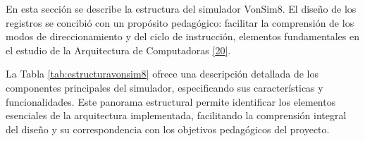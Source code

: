 \documentclass[12pt,oneside]{templates/unerthesis}
\begin{document}
En esta sección se describe la estructura del simulador VonSim8. El diseño de los registros se concibió con un propósito pedagógico: facilitar la comprensión de los modos de direccionamiento y del ciclo de instrucción, elementos fundamentales en el estudio de la Arquitectura de Computadoras \protect\hyperlink{ref-stallings_computer_2021}{{[}20{]}}.

La Tabla \ref{tab:estructuravonsim8} ofrece una descripción detallada de los componentes principales del simulador, especificando sus características y funcionalidades. Este panorama estructural permite identificar los elementos esenciales de la arquitectura implementada, facilitando la comprensión integral del diseño y su correspondencia con los objetivos pedagógicos del proyecto.

\begin{table}[!h]
\centering
\caption{\label{tab:estructuravonsim8}Estructura VonSim8: componentes principales y características}
\centering
{}
\end{table}
\end{document}
